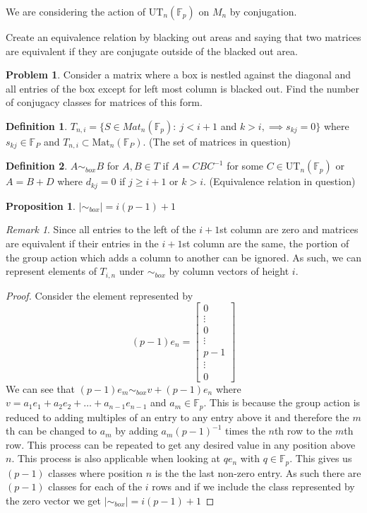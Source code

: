 \documentclass[12pt]{article}
\newtheorem{prop}{Proposition}
\theoremstyle{definition}
\newtheorem{defn}{Definition}
\newtheorem{problem}{Problem}
\theoremstyle{remark}
\newtheorem*{rem}{Remark}
\newcommand{\UT}{\mathrm{UT}}
\newcommand{\Mat}{\mathrm{Mat}}
\newcommand{\FF}{\mathbb{F}}
\begin{document}
 
We are considering the action of $\UT_n(\FF_p)$ on $M_n$ by conjugation.

Create an equivalence relation by blacking out areas and saying that two matrices are equivalent if they are conjugate outside of the blacked out area.

\begin{problem}
Consider a matrix where a box is nestled against the diagonal and all entries of the box except for left most column is blacked out. Find the number of conjugacy classes for matrices of this form.
\end{problem}
\begin{defn} $T_{n,i}=\{S\in Mat_n(\FF_p):\:j<i+1$ and $k>i,\implies s_{kj}=0\}$ where $s_{kj}\in\FF_P$ and $T_{n,i}\subset \Mat_{n}(\FF_P)$. (The set of matrices in question)
\end{defn}
\begin{defn}
 $A\sim_{box}B$ for $A,B\in T$ if $A=CBC^{-1}$ for some $C\in \UT_n(\FF_p)$ or $A=B+D$ where $d_{kj}=0$ if $j\geq i+1$ or $k>i$. (Equivalence relation in question)
\end{defn}
\begin{prop}
$|\sim_{box}|=i(p-1)+1$
\end{prop}
\begin{rem}
Since all entries to the left of the $i+1$st column are zero and matrices are equivalent if their entries in the $i+1$st column are the same, the portion of the group action which adds a column to another can be ignored. As such, we can represent elements of $T_{i,n}$ under $\sim_{box}$ by column vectors of height $i$.
\end{rem}
\begin{proof}
	Consider the element represented by $$(p-1)e_n=\begin{bmatrix} 0\\ \vdots\\ 0\\\vdots\\ p-1\\\vdots\\0 \end{bmatrix}$$ We can see that $(p-1)e_m\sim_{box} v+(p-1)e_n$ where $v=a_1e_1+a_2e_2+\hdots+a_{n-1}e_{n-1}$ and $a_m\in\FF_p$. This is because the group action is reduced to adding multiples of an entry to any entry above it and therefore the $m$th can be changed to $a_m$ by adding $a_m(p-1)^{-1}$ times the $n$th row to the $m$th row. This process can be repeated to get any desired value in any position above $n$. This process is also applicable when looking at  $qe_n$ with $q\in\FF_p$. This gives us $(p-1)$ classes where position $n$ is the the last non-zero entry. As such there are $(p-1)$ classes for each of the $i$ rows and if we include the class represented by the zero vector we get $|\sim_{box}|=i(p-1)+1$
\end{proof}
\end{document}
